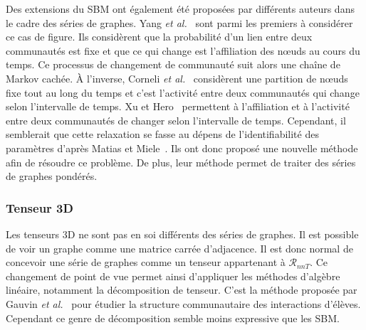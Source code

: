 Des extensions du SBM ont également été proposées par différents auteurs dans le cadre des séries de graphes.
Yang \emph{et al.}~\cite{Yang2011} sont parmi les premiers à considérer ce cas de figure.
Ils considèrent que la probabilité d'un lien entre deux communautés est fixe et que ce qui change est l'affiliation des n\oe{}uds au cours du temps.
Ce processus de changement de communauté suit alors une chaîne de Markov cachée.
\`A l'inverse, Corneli \emph{et al.}~\cite{Corneli2016} considèrent une partition de n\oe{}uds fixe tout au long du temps et c'est l'activité entre deux communautés qui change selon l'intervalle de temps.
Xu et Hero~\cite{Xu2014} permettent à l'affiliation et à l'activité entre deux communautés de changer selon l'intervalle de temps.
Cependant, il semblerait que cette relaxation se fasse au dépens de l'identifiabilité des paramètres d'après Matias et Miele~\cite{Matias2015}.
Ils ont donc proposé une nouvelle méthode afin de résoudre ce problème.
De plus, leur méthode permet de traiter des séries de graphes pondérés.

\subsubsection{Tenseur 3D}
Les tenseurs 3D ne sont pas en soi différents des séries de graphes.
Il est possible de voir un graphe comme une matrice carrée d'adjacence.
Il est donc normal de concevoir une série de graphes comme un tenseur appartenant à $\mathcal{R}_{nnT}$.
Ce changement de point de vue permet ainsi d'appliquer les méthodes d'algèbre linéaire, notamment la décomposition de tenseur.
C'est la méthode proposée par Gauvin \emph{et al.}~\cite{Gauvin2014} pour étudier la structure communautaire des interactions d'élèves.
Cependant ce genre de décomposition semble moins expressive que les SBM.


